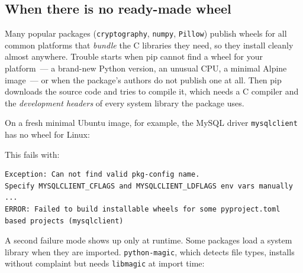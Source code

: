 \subsection*{When there is no ready-made wheel}\label{07-environment-drift:when-there-is-no-ready-made-wheel}

Many popular packages (\texttt{cryptography}, \texttt{numpy}, \texttt{Pillow}) publish wheels for all common platforms that \emph{bundle} the C libraries they need, so they install cleanly almost anywhere. Trouble starts when pip cannot find a wheel for your platform~--- a brand-new Python version, an unusual CPU, a minimal Alpine image~--- or when the package's authors do not publish one at all. Then pip downloads the source code and tries to compile it, which needs a C compiler and the \emph{development headers} of every system library the package uses.

On a fresh minimal Ubuntu image, for example, the MySQL driver \texttt{mysqlclient} has no wheel for Linux:

\begin{codebox}[short]

\begin{Shaded}
\begin{Highlighting}[]
\end{Highlighting}
\end{Shaded}

\end{codebox}

\noindent{}This fails with:

\begin{outputbox}[short]
\begin{Verbatim}[fontsize=\codesize, breaklines, breakanywhere, breaksymbolleft={\tiny\textcolor{muted}{$\hookrightarrow$}}]
Exception: Can not find valid pkg-config name.
Specify MYSQLCLIENT_CFLAGS and MYSQLCLIENT_LDFLAGS env vars manually
...
ERROR: Failed to build installable wheels for some pyproject.toml based projects (mysqlclient)
\end{Verbatim}
\end{outputbox}

\noindent{}A second failure mode shows up only at runtime. Some packages load a system library when they are imported. \texttt{python-magic}, which detects file types, installs without complaint but needs \texttt{libmagic} at import time:

\begin{codebox}[short]

\begin{Shaded}
\begin{Highlighting}[]
\end{Highlighting}
\end{Shaded}

\end{codebox}

